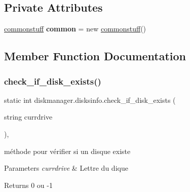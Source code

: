 \subsection*{Private Attributes}
\begin{DoxyCompactItemize}
\item 
\mbox{\label{classdiskmanager_1_1disksinfo_ae9b0f6395bbeb0152094fe6430f82f2c}} 
\hyperlink{classcommonmanager_1_1commonstuff}{commonstuff} {\bfseries common} = new \hyperlink{classcommonmanager_1_1commonstuff}{commonstuff}()
\end{DoxyCompactItemize}


\subsection{Member Function Documentation}
\mbox{\label{classdiskmanager_1_1disksinfo_a19e7f3c67bd27b94b5ee46157ace2bc8}} 
\subsubsection{\texorpdfstring{check\+\_\+if\+\_\+disk\+\_\+exists()}{check\_if\_disk\_exists()}}
{\footnotesize\ttfamily static int diskmanager.\+disksinfo.\+check\+\_\+if\+\_\+disk\+\_\+exists (\begin{DoxyParamCaption}\item[{string}]{currdrive }\end{DoxyParamCaption})\hspace{0.3cm}{\ttfamily [static]}, {\ttfamily [private]}}



méthode pour vérifier si un disque existe 


\begin{DoxyParams}{Parameters}
{\em currdrive} & Lettre du dique\\
\hline
\end{DoxyParams}
\begin{DoxyReturn}{Returns}
0 ou -\/1 
\end{DoxyReturn}
\mbox{\label{classdiskmanager_1_1disksinfo_a314d1116f663bdd1ba60a9966e2436fa}} 
